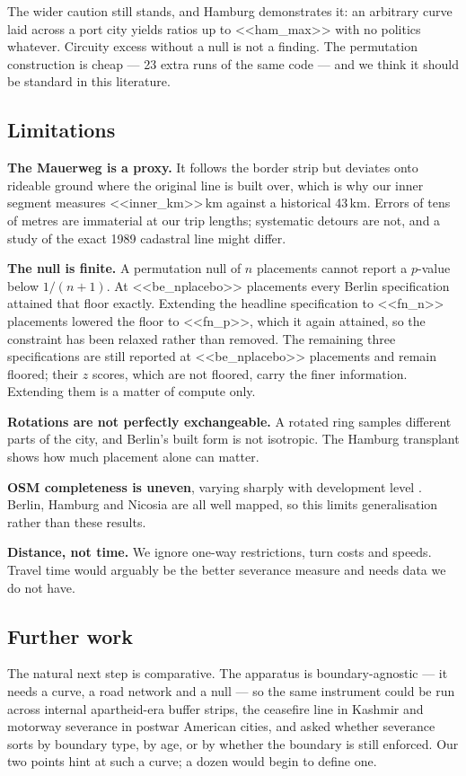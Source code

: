 \documentclass[11pt,a4paper]{article}
\begin{document}
The wider caution still stands, and Hamburg demonstrates it: an arbitrary curve
laid across a port city yields ratios up to <<ham_max>> with no politics
whatever. Circuity excess without a null is not a finding. The permutation
construction is cheap --- 23 extra runs of the same code --- and we think it
should be standard in this literature.

\subsection{Limitations}\label{sec:limits}

\textbf{The Mauerweg is a proxy.} It follows the border strip but deviates onto
rideable ground where the original line is built over, which is why our inner
segment measures <<inner_km>>\,km against a historical 43\,km. Errors of tens of
metres are immaterial at our trip lengths; systematic detours are not, and a
study of the exact 1989 cadastral line might differ.

\textbf{The null is finite.} A permutation null of $n$ placements cannot report
a $p$-value below $1/(n+1)$. At <<be_nplacebo>> placements every Berlin
specification attained that floor exactly. Extending the headline specification
to <<fn_n>> placements lowered the floor to <<fn_p>>, which it again attained,
so the constraint has been relaxed rather than removed. The remaining three
specifications are still reported at <<be_nplacebo>> placements and remain
floored; their $z$ scores, which are not floored, carry the finer information.
Extending them is a matter of compute only.

\textbf{Rotations are not perfectly exchangeable.} A rotated ring samples
different parts of the city, and Berlin's built form is not isotropic. The
Hamburg transplant shows how much placement alone can matter.

\textbf{OSM completeness is uneven}, varying sharply with development level
\cite{osm2023}. Berlin, Hamburg and Nicosia are all well mapped, so this limits
generalisation rather than these results.

\textbf{Distance, not time.} We ignore one-way restrictions, turn costs and
speeds. Travel time would arguably be the better severance measure and needs
data we do not have.

\subsection{Further work}

The natural next step is comparative. The apparatus is boundary-agnostic --- it
needs a curve, a road network and a null --- so the same instrument could be run
across internal apartheid-era buffer strips, the ceasefire line in Kashmir and
motorway severance in postwar American cities, and asked whether severance sorts
by boundary type, by age, or by whether the boundary is still enforced. Our two
points hint at such a curve; a dozen would begin to define one.
\end{document}
